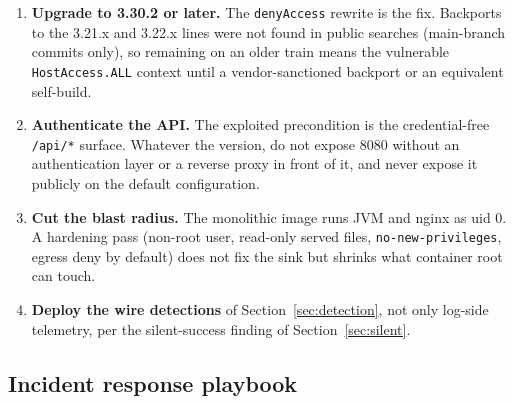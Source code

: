 \documentclass[journal]{IEEEtran}
\begin{document}
\begin{enumerate}
\item \textbf{Upgrade to 3.30.2 or later.} The \texttt{denyAccess} rewrite is
the fix. Backports to the 3.21.x and 3.22.x lines were not found in public
searches (main-branch commits only), so remaining on an older train means the
vulnerable \texttt{HostAccess.ALL} context until a vendor-sanctioned backport
or an equivalent self-build.
\item \textbf{Authenticate the API.} The exploited precondition is the
credential-free \texttt{/api/*} surface. Whatever the version, do not expose
8080 without an authentication layer or a reverse proxy in front of it, and
never expose it publicly on the default configuration.
\item \textbf{Cut the blast radius.} The monolithic image runs JVM and nginx
as uid 0. A hardening pass (non-root user, read-only served files,
\texttt{no-new-privileges}, egress deny by default) does not fix the sink but
shrinks what container root can touch.
\item \textbf{Deploy the wire detections} of Section~\ref{sec:detection}, not
only log-side telemetry, per the silent-success finding of
Section~\ref{sec:silent}.
\end{enumerate}

\subsection{Incident response playbook}
\end{document}
